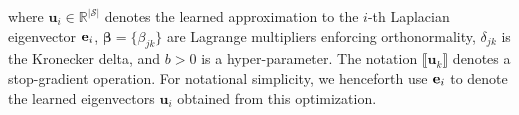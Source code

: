 \documentclass{article}
\theoremstyle{plain}
\theoremstyle{definition}
\theoremstyle{remark}
\begin{document}
where $\mathbf{u}_i \in \mathbb{R}^{|\mathscr{S}|}$ denotes the learned approximation to the $i$-th Laplacian eigenvector $\mathbf{e}_i$, $\boldsymbol{\beta} = \{\beta_{jk}\}$ are Lagrange multipliers enforcing orthonormality, $\delta_{jk}$ is the Kronecker delta, and $b > 0$ is a hyper-parameter. The notation $\llbracket \mathbf{u}_k \rrbracket$ denotes a stop-gradient operation. For notational simplicity, we henceforth use $\mathbf{e}_i$ to denote the learned eigenvectors $\mathbf{u}_i$ obtained from this optimization.


\end{document}
